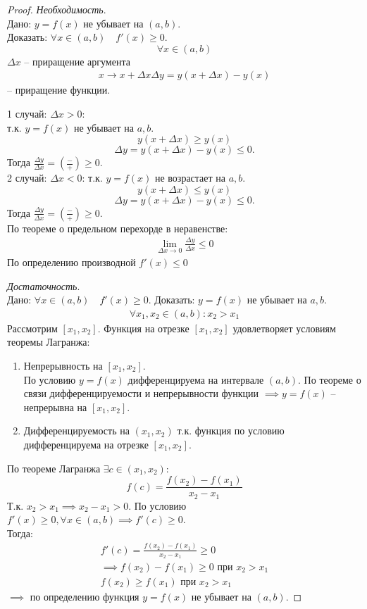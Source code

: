 \begin{proof}
  \textit{Необходимость}. \\
  Дано: $y=f(x)$ не убывает на $(a, b)$. \\
  Доказать:  $\forall x \in (a, b) \quad f'(x) \ge 0$. \[
  \forall x \in (a, b)
  \] 
  $\Delta x$ -- приращение аргумента
  \begin{gather*}
    x \to  x + \Delta x
    \Delta  y = y(x + \Delta x) - y(x)
  \end{gather*}
  -- приращение функции.

  1 случай: $\Delta x > 0$: \\
  т.к. $y = f(x)$ не убывает на  $a, b$.  \[
  y(x + \Delta x) \ge  y(x)
  \] \[
  \Delta  y = y(x + \Delta x) - y(x) \le 0.
  \] 
  Тогда $\frac{\Delta y}{\Delta x} = \left( \frac{-}{+} \right) \ge 0$. \\

  2 случай: $\Delta  x < 0$: 
  т.к. $y = f(x)$ не возрастает на  $a, b$.  \[
  y(x + \Delta x) \le y(x)
  \] \[
  \Delta  y = y(x + \Delta x) - y(x) \le 0.
  \] 
  Тогда $\frac{\Delta y}{\Delta x} = \left( \frac{-}{+} \right) \ge 0$. \\

  По теореме о предельном перехорде в неравенстве: 
  \begin{gather*}
    \lim_{\Delta x \to 0} \frac{\Delta y}{\Delta x} \le 0 
  \end{gather*}
  По определению производной $f'(x) \le 0$

  \textit{Достаточность}. \\
  Дано: $\forall x \in (a, b) \quad f'(x) \ge 0$.
  Доказать: $y = f(x)$ не убывает на  $a, b$.
   \begin{gather*}
    \forall x_1, x_2 \in (a,b) : x_2 > x_1
  \end{gather*}
  Рассмотрим $[x_1, x_2]$. Функция на отрезке $[x_1, x_2]$ удовлетворяет условиям теоремы Лагранжа:
  \begin{enumerate}
    \item Непрерывность на $[x_1, x_2]$. \\
      По условию $y = f(x)$ дифференцируема на интервале  $(a, b)$. По теореме о связи дифференцируемости и непрерывности функции  $\implies y=f(x)$ -- непрерывна на $[x_1, x_2]$.
    \item Дифференцируемость на $(x_1, x_2)$ т.к. функция по условию дифференцируема на отрезке $[x_1, x_2]$.
  \end{enumerate}
  По теореме Лагранжа $\exists c \in (x_1, x_2)$: \[
  f(c) = \frac{f(x_2) - f(x_1)}{x_2 - x_1}
  \] 
  Т.к. $x_2 > x_1 \implies x_2 - x_1 > 0$. По условию $f'(x) \ge  0, \forall x \in  (a, b) \implies f'(c) \ge 0$. \\
  Тогда:
  \begin{gather*}
    f'(c) = \frac{f(x_2) - f(x_1)}{x_2 - x_1} \ge 0 \\
    \implies f(x_2) - f(x_1) \ge  0 \text{ при } x_2 > x_1 \\
    f(x_2) \ge  f(x_1) \text{ при } x_2 > x_1
  \end{gather*}
  $\implies$ по определению функция $y = f(x)$ не убывает на $(a, b)$.
\end{proof}

